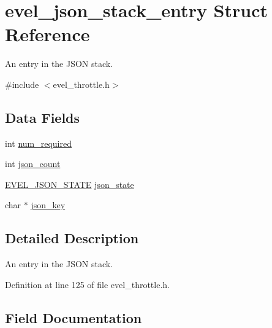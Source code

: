 \hypertarget{structevel__json__stack__entry}{}\section{evel\+\_\+json\+\_\+stack\+\_\+entry Struct Reference}
\label{structevel__json__stack__entry}


An entry in the J\+S\+ON stack.  




{\ttfamily \#include $<$evel\+\_\+throttle.\+h$>$}

\subsection*{Data Fields}
\begin{DoxyCompactItemize}
\item 
int \hyperlink{structevel__json__stack__entry_a46862bf5ad0d1cd020923b574a2f207b}{num\+\_\+required}
\item 
int \hyperlink{structevel__json__stack__entry_a5760e6354d6d78d1955c6a14aa77b194}{json\+\_\+count}
\item 
\hyperlink{evel__throttle_8h_af2ee805305a97e62d3b9d3e526513b6a}{E\+V\+E\+L\+\_\+\+J\+S\+O\+N\+\_\+\+S\+T\+A\+TE} \hyperlink{structevel__json__stack__entry_a7b10fc3a2f252b1dcc105ab607b93a54}{json\+\_\+state}
\item 
char $\ast$ \hyperlink{structevel__json__stack__entry_a838ed139e83ef12665ed91cad1e2bd4c}{json\+\_\+key}
\end{DoxyCompactItemize}


\subsection{Detailed Description}
An entry in the J\+S\+ON stack. 

Definition at line 125 of file evel\+\_\+throttle.\+h.



\subsection{Field Documentation}
\hypertarget{structevel__json__stack__entry_a5760e6354d6d78d1955c6a14aa77b194}{}\label{structevel__json__stack__entry_a5760e6354d6d78d1955c6a14aa77b194} 
